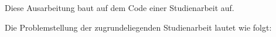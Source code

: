 
Diese Ausarbeitung baut auf dem Code einer Studienarbeit auf.

Die Problemstellung der zugrundeliegenden Studienarbeit lautet wie folgt:
\glqq


\grqq \cite{}






